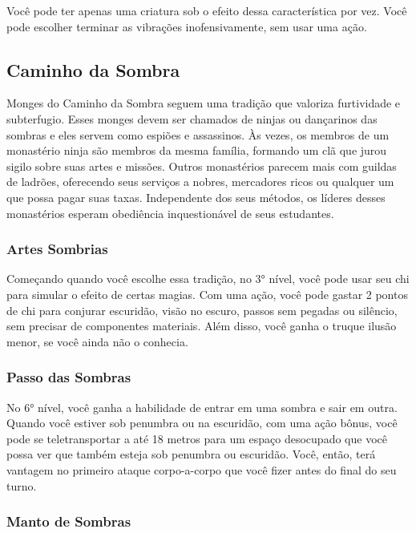 \begin{multicols}{2}
Você pode ter apenas uma criatura sob o efeito dessa característica por vez.
Você pode escolher terminar as vibrações inofensivamente, sem usar uma ação.

\subsection*{Caminho da Sombra}%
\label{sub:caminho_da_sombra}

Monges do Caminho da Sombra seguem uma tradição que valoriza furtividade e
subterfugio. Esses monges devem ser chamados de ninjas ou dançarinos das sombras
e eles servem como espiões e assassinos. Às vezes, os membros de um monastério
ninja são membros da mesma família, formando um clã que jurou sigilo sobre suas
artes e missões. Outros monastérios parecem mais com guildas de ladrões,
oferecendo seus serviços a nobres, mercadores ricos ou qualquer um que possa
pagar suas taxas. Independente dos seus métodos, os líderes desses monastérios
esperam obediência inquestionável de seus estudantes.

\subsubsection*{Artes Sombrias}%
\label{ssub:artes_sombrias}

Começando quando você escolhe essa tradição, no 3° nível, você pode usar seu chi
para simular o efeito de certas magias. Com uma ação, você pode gastar 2 pontos
de chi para conjurar escuridão, visão no escuro, passos sem pegadas ou silêncio,
sem precisar de componentes materiais. Além disso, você ganha o truque ilusão
menor, se você ainda não o conhecia.

\subsubsection*{Passo das Sombras}%
\label{ssub:passo_das_sombras}

No 6° nível, você ganha a habilidade de entrar em uma sombra e sair em outra.
Quando você estiver sob penumbra ou na escuridão, com uma ação bônus, você pode
se teletransportar a até 18 metros para um espaço desocupado que você possa ver
que também esteja sob penumbra ou escuridão. Você, então, terá vantagem no
primeiro ataque corpo-a-corpo que você fizer antes do final do seu turno.

\subsubsection*{Manto de Sombras}%
\label{ssub:manto_de_sombras}


\end{multicols}
